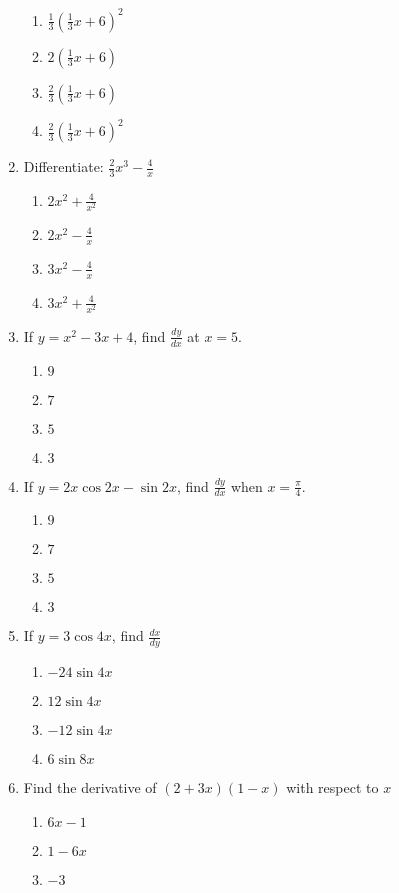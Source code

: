 \begin{enumerate}[label={\arabic*.}]
\begin{enumerate}[label={\Alph*.}]
	\item \(\frac{1}{3}(\frac{1}{3}x + 6)^2\)
	\item \(2(\frac{1}{3}x + 6)\)
	\item \(\frac{2}{3}(\frac{1}{3}x + 6)\)
	\item \(\frac{2}{3}(\frac{1}{3}x + 6)^2\)
	\end{enumerate}
\item Differentiate: \(\frac{2}{3}x^{3}-\frac{4}{x}\)
	\begin{enumerate}[label={\Alph*.}]
	\item \(2x^2 + \frac{4}{x^2}\)
	\item \(2x^{2}-\frac{4}{x}\)
	\item \(3x^{2}-\frac{4}{x}\)
	\item \(3x^{2}+\frac{4}{x^2}\)
	\end{enumerate}
\item If \(y=x^2-3x+4\), find \(\frac{dy}{dx}\) at \(x=5\).
	\begin{enumerate}[label={\Alph*.}]
	\item \(9\)
	\item \(7\)
	\item \(5\)
	\item \(3\)
	\end{enumerate}
\item If \(y= 2x\cos{2x} -\sin{2x}\), find \(\frac{dy}{dx}\) when \(x=\frac{\pi}{4}\).
	\begin{enumerate}[label={\Alph*.}]
	\item \(9\)
	\item \(7\)
	\item \(5\)
	\item \(3\)
	\end{enumerate}
\item If \(y=3\cos{4x}\), find \(\frac{dx}{dy}\)
	\begin{enumerate}[label={\Alph*.}]
	\item \(-24\sin{4x}\)
	\item \(12\sin{4x}\)
	\item \(-12 \sin{4x}\)
	\item \(6\sin{8x}\)
	\end{enumerate}
\item Find the derivative of \((2+3x)(1-x)\) with respect to \(x\)
	\begin{enumerate}[label={\Alph*.}]
	\item \(6x-1\)
	\item \(1-6x\)
	\item \(-3\)

\end{enumerate}
\end{enumerate}

